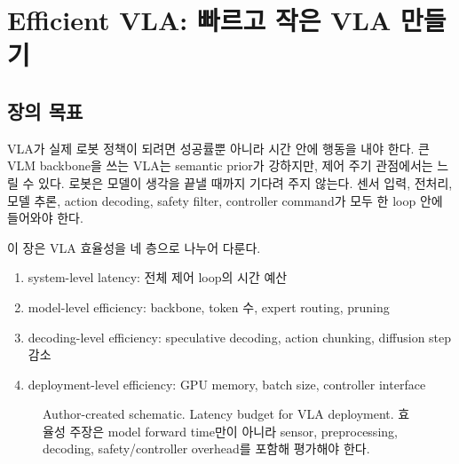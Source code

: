 \chapter{Efficient VLA: 빠르고 작은 VLA 만들기}

\section{장의 목표}

VLA가 실제 로봇 정책이 되려면 성공률뿐 아니라 시간 안에 행동을 내야 한다. 큰 VLM backbone을 쓰는 VLA는 semantic prior가 강하지만, 제어 주기 관점에서는 느릴 수 있다. 로봇은 모델이 생각을 끝낼 때까지 기다려 주지 않는다. 센서 입력, 전처리, 모델 추론, action decoding, safety filter, controller command가 모두 한 loop 안에 들어와야 한다.

이 장은 VLA 효율성을 네 층으로 나누어 다룬다.

\begin{enumerate}
  \item system-level latency: 전체 제어 loop의 시간 예산
  \item model-level efficiency: backbone, token 수, expert routing, pruning
  \item decoding-level efficiency: speculative decoding, action chunking, diffusion step 감소
  \item deployment-level efficiency: GPU memory, batch size, controller interface
\end{enumerate}

\begin{figure}[t]
  \centering
  \caption{Author-created schematic. Latency budget for VLA deployment. 효율성 주장은 model forward time만이 아니라 sensor, preprocessing, decoding, safety/controller overhead를 포함해 평가해야 한다.}
  \label{fig:latency_budget}
\end{figure}

